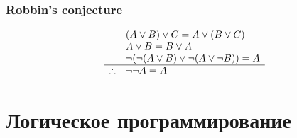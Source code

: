 \documentclass[24pt,pdf,hyperref={unicode},aspectratio=169]{beamer}
\begin{document}
\begin{frame}\frametitle{Robbin's conjecture}
$$
\begin{array}{l l}
& (A\vee B)\vee C = A \vee (B\vee C) \\
& A\vee B=B\vee A \\
& \neg( \neg(A\vee B) \vee \neg(A\vee \neg B) ) = A\\
\hline 
\therefore & \neg \neg A=A
\end{array}
$$
\end{frame}

\section{Логическое программирование}


\newcommand{\myrect}[5] 
{
\draw[thick] (#1,#2) rectangle ($(#1+#3,#2+#4)$); 
\node at ($(#1,#2)+(#3 /2,#4 /2)$) {#5};
}
\usetikzlibrary{calc}
\end{document}
